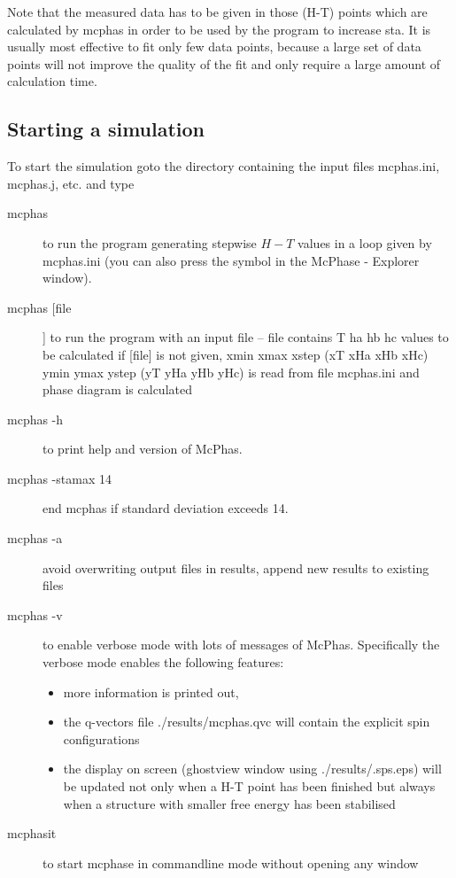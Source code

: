 Note that the measured data has to be given in those (H-T) points which are 
calculated by mcphas in order to be used by the program to increase {\prg sta}.
It is usually most effective to fit only few data points, because a large set
of data points will not improve the quality of the fit and only require a large
amount of calculation time.



\subsection{Starting a simulation}
\label{start}

To start the simulation goto the directory containing the
input files {\prg mcphas.ini, mcphas.j, etc. } and type

\begin{description}
\item[\prg mcphas] to run the program generating stepwise $H-T$ values 
              in a loop given by {\prg mcphas.ini} (you can also press the
              symbol in the {\prg McPhase - Explorer} window).
\item[\prg mcphas [file]]  to run the program with an input file --   
             {\prg file} contains T ha hb hc values to be calculated 
             if [file] is not given, xmin xmax xstep (xT xHa xHb xHc)
             ymin ymax ystep (yT yHa yHb yHc) is read from file {\prg mcphas.ini}
	     and phase diagram is calculated
\item[\prg mcphas -h]  to  print help and version of {\prg McPhas}.
\item[\prg mcphas -stamax 14]  end mcphas if standard deviation exceeds 14.
\item[\prg mcphas -a] avoid overwriting output files in results, append new results to existing files
\item[\prg mcphas -v]  to  enable verbose mode with lots of messages of {\prg McPhas}. Specifically
the verbose mode enables the following features:
  \begin{itemize}
			          \item more information is printed out, 
			          \item the q-vectors file {\prg ./results/mcphas.qvc} will contain 
				    the explicit spin configurations
			          \item the display on screen (ghostview window using 
				     {\prg ./results/.sps.eps}) will be updated not only 
				    when a H-T point has been finished but always 
				    when a structure with smaller free energy 
				    has been stabilised
  \end{itemize}
\item[\prg mcphasit] to start mcphase in commandline mode without opening any window
\end{description}

